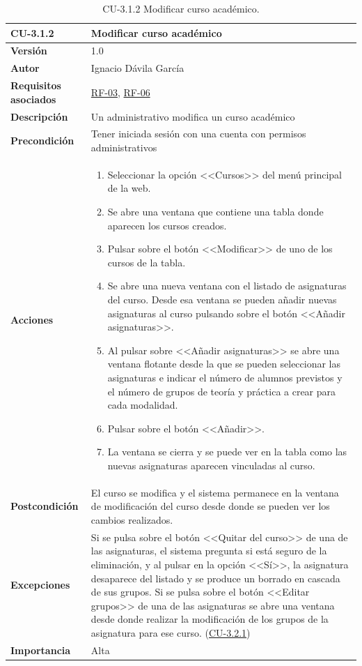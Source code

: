 \begin{table}[p]
\label{table:CU-3.1.2}
	\centering
	\begin{tabularx}{\linewidth}{ p{} p{} }
		\toprule
		\textbf{CU-3.1.2}    & \textbf{Modificar curso académico}\\
		\toprule
		\textbf{Versión}              & 1.0    \\
		\textbf{Autor}                & Ignacio Dávila García \\
		\textbf{Requisitos asociados} & \hyperref[itm:RF3]{RF-03}, \hyperref[itm:RF6]{RF-06} \\
		\textbf{Descripción}          & Un administrativo modifica un curso académico \\
		\textbf{Precondición}         & Tener iniciada sesión con una cuenta con permisos administrativos \\
		\textbf{Acciones}             &
		\begin{enumerate}
			\def\labelenumi{\arabic{enumi}.}
			\tightlist
			\item Seleccionar la opción <<Cursos>> del menú principal de la web.
			\item Se abre una ventana que contiene una tabla donde aparecen los cursos creados.
			\item Pulsar sobre el botón <<Modificar>> de uno de los cursos de la tabla.
			\item Se abre una nueva ventana con el listado de asignaturas del curso. Desde esa ventana se pueden añadir nuevas asignaturas al curso pulsando sobre el botón <<Añadir asignaturas>>.
			\item Al pulsar sobre <<Añadir asignaturas>> se abre una ventana flotante desde la que se pueden seleccionar las asignaturas e indicar el número de alumnos previstos y el número de grupos de teoría y práctica a crear para cada modalidad. 
			\item Pulsar sobre el botón <<Añadir>>.
			\item La ventana se cierra y se puede ver en la tabla como las nuevas asignaturas aparecen vinculadas al curso.
		\end{enumerate}\\
		\textbf{Postcondición}        & El curso se modifica y el sistema permanece en la ventana de modificación del curso desde donde se pueden ver los cambios realizados. \\
		\textbf{Excepciones}          & Si se pulsa sobre el botón <<Quitar del curso>> de una de las asignaturas, el sistema pregunta si está seguro de la eliminación, y al pulsar en la opción <<Sí>>, la asignatura desaparece del listado y se produce un borrado en cascada de sus grupos. Si se pulsa sobre el botón <<Editar grupos>> de una de las asignaturas se abre una ventana desde donde realizar la modificación de los grupos de la asignatura para ese curso. (\hyperref[table:CU-3.2.1]{CU-3.2.1}) \\
		\textbf{Importancia}          & Alta \\
		\bottomrule
	\end{tabularx}
	\caption{CU-3.1.2 Modificar curso académico.}
\end{table}
\FloatBarrier

